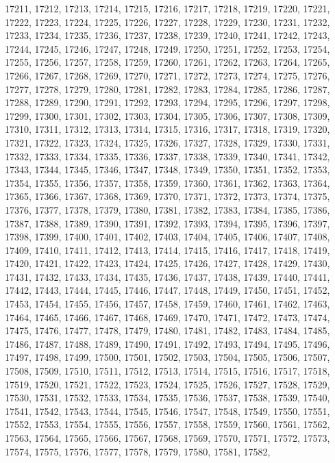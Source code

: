 17211,
17212,
17213,
17214,
17215,
17216,
17217,
17218,
17219,
17220,
17221,
17222,
17223,
17224,
17225,
17226,
17227,
17228,
17229,
17230,
17231,
17232,
17233,
17234,
17235,
17236,
17237,
17238,
17239,
17240,
17241,
17242,
17243,
17244,
17245,
17246,
17247,
17248,
17249,
17250,
17251,
17252,
17253,
17254,
17255,
17256,
17257,
17258,
17259,
17260,
17261,
17262,
17263,
17264,
17265,
17266,
17267,
17268,
17269,
17270,
17271,
17272,
17273,
17274,
17275,
17276,
17277,
17278,
17279,
17280,
17281,
17282,
17283,
17284,
17285,
17286,
17287,
17288,
17289,
17290,
17291,
17292,
17293,
17294,
17295,
17296,
17297,
17298,
17299,
17300,
17301,
17302,
17303,
17304,
17305,
17306,
17307,
17308,
17309,
17310,
17311,
17312,
17313,
17314,
17315,
17316,
17317,
17318,
17319,
17320,
17321,
17322,
17323,
17324,
17325,
17326,
17327,
17328,
17329,
17330,
17331,
17332,
17333,
17334,
17335,
17336,
17337,
17338,
17339,
17340,
17341,
17342,
17343,
17344,
17345,
17346,
17347,
17348,
17349,
17350,
17351,
17352,
17353,
17354,
17355,
17356,
17357,
17358,
17359,
17360,
17361,
17362,
17363,
17364,
17365,
17366,
17367,
17368,
17369,
17370,
17371,
17372,
17373,
17374,
17375,
17376,
17377,
17378,
17379,
17380,
17381,
17382,
17383,
17384,
17385,
17386,
17387,
17388,
17389,
17390,
17391,
17392,
17393,
17394,
17395,
17396,
17397,
17398,
17399,
17400,
17401,
17402,
17403,
17404,
17405,
17406,
17407,
17408,
17409,
17410,
17411,
17412,
17413,
17414,
17415,
17416,
17417,
17418,
17419,
17420,
17421,
17422,
17423,
17424,
17425,
17426,
17427,
17428,
17429,
17430,
17431,
17432,
17433,
17434,
17435,
17436,
17437,
17438,
17439,
17440,
17441,
17442,
17443,
17444,
17445,
17446,
17447,
17448,
17449,
17450,
17451,
17452,
17453,
17454,
17455,
17456,
17457,
17458,
17459,
17460,
17461,
17462,
17463,
17464,
17465,
17466,
17467,
17468,
17469,
17470,
17471,
17472,
17473,
17474,
17475,
17476,
17477,
17478,
17479,
17480,
17481,
17482,
17483,
17484,
17485,
17486,
17487,
17488,
17489,
17490,
17491,
17492,
17493,
17494,
17495,
17496,
17497,
17498,
17499,
17500,
17501,
17502,
17503,
17504,
17505,
17506,
17507,
17508,
17509,
17510,
17511,
17512,
17513,
17514,
17515,
17516,
17517,
17518,
17519,
17520,
17521,
17522,
17523,
17524,
17525,
17526,
17527,
17528,
17529,
17530,
17531,
17532,
17533,
17534,
17535,
17536,
17537,
17538,
17539,
17540,
17541,
17542,
17543,
17544,
17545,
17546,
17547,
17548,
17549,
17550,
17551,
17552,
17553,
17554,
17555,
17556,
17557,
17558,
17559,
17560,
17561,
17562,
17563,
17564,
17565,
17566,
17567,
17568,
17569,
17570,
17571,
17572,
17573,
17574,
17575,
17576,
17577,
17578,
17579,
17580,
17581,
17582,
